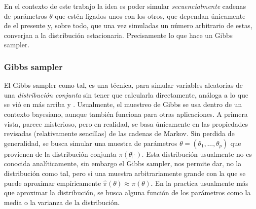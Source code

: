 \documentclass[../Main/Main.tex]{subfiles}
\begin{document}
En el contexto de este trabajo la idea es poder simular \textit{secuencialmente} cadenas de parámetros $\theta$ que estén ligados unos con los otros, que dependan únicamente de el presente y,  sobre todo, que una vez simuladas un número arbitrario de estas, converjan a la distribución estacionaria. Precisamente lo que hace un Gibbs sampler.

\subsubsection{Gibbs sampler}
El Gibbs sampler como tal, es una técnica, para simular variables aleatorias de una \textit{distribución conjunta} sin tener que calcularla directamente, análoga a lo que se vió en más arriba \autocite{gelfand1990sampling} y \autocite{casella1992explaining}. Usualmente, el muestreo de Gibbs se usa dentro de un contexto bayesiano, aunque también funciona para otras aplicaciones. A primera vista, parece misterioso, pero en realidad, se basa únicamente en las propiedades revisadas (relativamente sencillas) de las cadenas de Markov. Sin perdida de generalidad, se busca simular una muestra de parámetros $\theta = (\theta_1,\ldots,\theta_p)$ que provienen de la distribución conjunta $\pi(\theta|\cdot)$. Esta distribución usualmente no es conocida analíticamente, sin embargo el Gibbs sampler, nos permite dar, no la distribución como tal, pero si una muestra arbitrariamente grande con la que se puede aproximar empíricamente $\hat{\pi}(\theta) \approx \pi(\theta)$. En la practica usualmente más que aproximar la distribución, se busca alguna función de los parámetros como la media o la varianza de la distribución.
\end{document}
